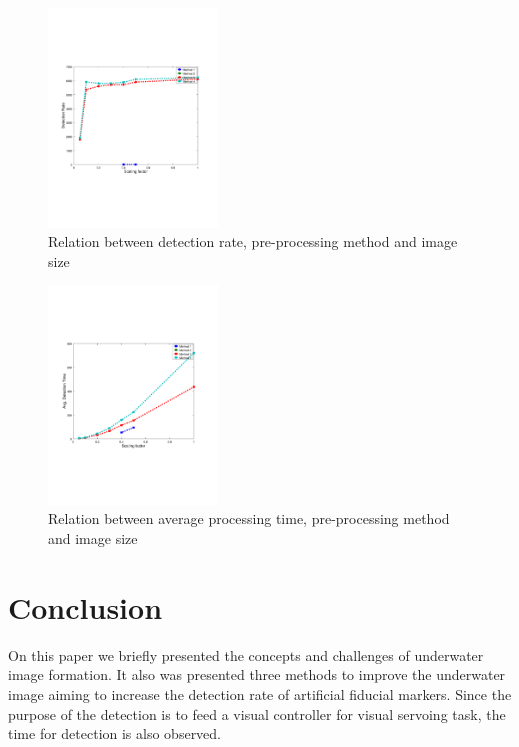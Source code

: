 \documentclass[conference, letterpaper]{IEEEtran}
\begin{document}
\begin{figure}[!ht]
	\centering
    \includegraphics[width=0.4\textwidth, trim={1.6cm 6.9cm 2.3cm 6.7cm}]{./fig/detection_rate2.pdf}
    \caption{Relation between detection rate, pre-processing method and image size}
	\label{fig:detection_rate2}
\end{figure}

\begin{figure}[!ht]
	\centering
    \includegraphics[width=0.4\textwidth, trim={1.6cm 6.9cm 2.3cm 6.7cm}]{./fig/detection_time2.pdf}
    \caption{Relation between average processing time, pre-processing method and image size}
	\label{fig:processing_time2}
\end{figure}

\section{Conclusion} \label{sec:concl}

On this paper we briefly presented the concepts and challenges of underwater
image formation. It also was presented three methods to improve the underwater
image aiming to increase the detection rate of artificial fiducial markers.
Since the purpose of the detection is to feed a visual controller for visual
servoing task, the time for detection is also observed.
\end{document}
